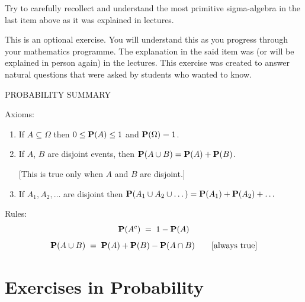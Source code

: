 \ee

\begin{Exercise}[title={intuiting sigma-algebra -- this is optional},label={underMPSA}]
Try to carefully recollect and understand the most primitive sigma-algebra in the last item above as it was explained in lectures.
\end{Exercise}
\begin{Answer}
This is an optional exercise. You will understand this as you progress through your mathematics programme. 
The explanation in the said item was (or will be explained in person again) in the lectures. 
This exercise was created to answer natural questions that were asked by students who wanted to know.
\end{Answer}


\begin{framed}
PROBABILITY SUMMARY

\medskip

Axioms:
\begin{enumerate}
\item If $A\subseteq \Omega$ then $0\leq \mathbf{P}(A)\leq 1$ and $\mathbf{P}(\Omega)=1$.
\item If $A$, $B$ are disjoint events, then $\mathbf{P}(A\cup B)=\mathbf{P}(A)+\mathbf{P}(B)$.

[This is true only when $A$ and $B$ are disjoint.]
\item If $A_1,A_2,\dots$ are disjoint then $\mathbf{P}(A_1\cup A_2
\cup\dots)=\mathbf{P}(A_1)+\mathbf{P}(A_2)+\dots$
\end{enumerate}
Rules:
$$\mathbf{P}(A^c)\;=\;1-\mathbf{P}(A)$$
$$\mathbf{P}(A\cup B)\;=\;\mathbf{P}(A)+\mathbf{P}(B)-\mathbf{P}(A\cap B) \qquad [\textrm{always true}]$$
\end{framed}

\section{Exercises in Probability}\label{S:xsProbability}

